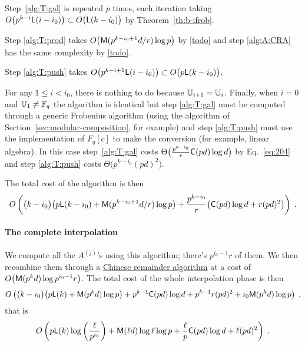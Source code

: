 Step~\ref{alg:T:gal} is repeated $p$ times, each iteration taking
$O\bigl(p^{k-i}{\sf L}(i-i_0)\bigr) \subset O\bigl({\sf
  L}(k-i_0)\bigr)$ by Theorem~\ref{th:b-ifrob}.

Step \ref{alg:T:prod} takes $O\bigl(\mathsf{M}(p^{k-i_0+1}d/r)\log p\bigr)$
by \ref{todo} and step \ref{alg:A:CRA} has the same
complexity by \ref{todo}.

Step \ref{alg:T:push} takes $O\bigl(p^{k-i+1}{\sf L}(i-i_0)\bigr)
\subset O\bigl(p{\sf L}(k-i_0)\bigr)$.

For any $1\le i<i_0$, there is nothing to do because
$\mathbb{U}_{i+1}=\mathbb{U}_i$. Finally, when $i=0$ and $\mathbb{U}_1\ne\mathbb{F}_q$ the algorithm
is identical but step \ref{alg:T:gal} must be computed through a
generic Frobenius algorithm (using the algorithm of
Section~\ref{sec:modular-composition}, for example) and step
\ref{alg:T:push} must use the implementation of $F_q[c]$ to make the
conversion (for example, linear algebra). In this case
step~\ref{alg:T:gal} costs
$\Theta\bigl(\frac{p^{k-i_0}}{r}\mathsf{C}(pd)\log d \bigr)$
by Eq.~\eqref{eq:204} and step \ref{alg:T:push} costs
$\Theta\bigl(p^{k-i_0}(pd)^2\bigr)$.

The total cost of the algorithm is then
\begin{equation*}
  \label{eq:T:complexity}
  O\left(\bigl(k-i_0\bigr)\bigl(p{\sf L}(k-i_0) + \mathsf{M}(p^{k-i_0+1}d/r)\log p\bigr) +
    \frac{p^{k-i_0}}{r}\bigl(\mathsf{C}(pd)\log d + r(pd)^2\bigr) \right)
  \;\text{.}
\end{equation*}


\paragraph{The complete interpolation}
We compute all the $A^{(j)}$'s using this algorithm; there's
$p^{i_0-1}r$ of them. We then recombine them through a
\hyperref[sec:chin-rema-algor]{Chinese remainder algorithm} at a cost
of $O\bigl(\mathsf{M}(p^kd)\log p^{i_0-1}r\bigr)$. The total cost of the
whole interpolation phase is then
\begin{equation*}
  O\left(\bigl(k-i_0\bigr) \bigl(p{\sf L}(k) + \mathsf{M}(p^kd)\log p\bigr) +
    p^{k-1}\mathsf{C}(pd)\log d + p^{k-1}r(pd)^2 + i_0\mathsf{M}(p^kd)\log p
  \right)
  \;\text{,}
\end{equation*}
that is
\begin{equation}
  \label{eq:interp}
  O\left(p{\sf L}(k)\log\left(\frac{\ell}{p^{i_0}}\right) + 
    \mathsf{M}(\ell d)\log\ell\log p +
    \frac{\ell}{p}\mathsf{C}(pd)\log d +
    \ell (pd)^2
  \right)
  \;\text{.}
\end{equation}

